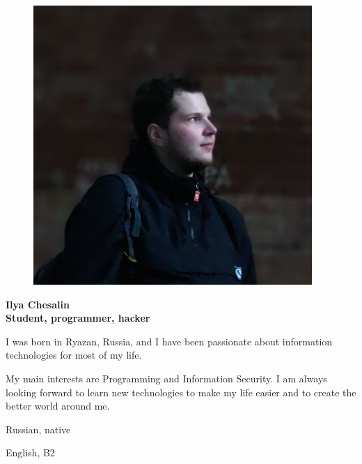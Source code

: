 \begin{figure}
	\hfill
	\includegraphics[width=0.6\columnwidth]{photo}
	\vspace{-7cm}
\end{figure}

\begin{flushright}\small

\end{flushright}\normalsize
\framebreak


\Huge\bfseries {{\color{Cyan} Ilya} {\color{Black} Chesalin}} \\
\Large\bfseries Student, programmer, hacker \\

\normalsize\normalfont

I was born in Ryazan, Russia, and I have been passionate about information
technologies for most of my life.

My main interests are Programming and Information Security. I am always looking
forward to learn new technologies to make my life easier and to create the
better world around me.

\Sep


\begin{multicols}{3}
\begin{compactitem}[\color{Cyan}$\circ$]
    \item Russian, native
    \item English, B2
\end{compactitem}
\end{multicols}

\SmallSep

